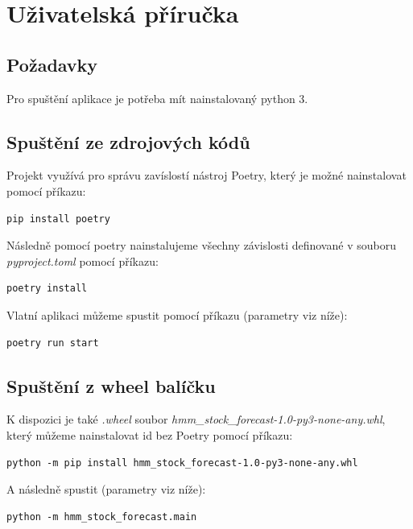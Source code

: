 \section{Uživatelská příručka}

\subsection{Požadavky}
Pro spuštění aplikace je potřeba mít nainstalovaný python 3.

\subsection{Spuštění ze zdrojových kódů}

Projekt využívá pro správu zavíslostí nástroj Poetry, který je možné nainstalovat
pomocí příkazu:
\begin{lstlisting}
pip install poetry
\end{lstlisting}

Následně pomocí poetry nainstalujeme všechny závislosti definované v souboru \emph{pyproject.toml}
pomocí příkazu:
\begin{lstlisting}
poetry install
\end{lstlisting}

Vlatní aplikaci můžeme spustit pomocí příkazu (parametry viz níže):
\begin{lstlisting}
poetry run start
\end{lstlisting}

\subsection{Spuštění z wheel balíčku}
K dispozici je také \emph{.wheel} soubor \emph{hmm\_stock\_forecast-1.0-py3-none-any.whl},
který můžeme nainstalovat id bez Poetry pomocí příkazu:
\begin{lstlisting}
python -m pip install hmm_stock_forecast-1.0-py3-none-any.whl
\end{lstlisting}
A následně spustit (parametry viz níže):
\begin{lstlisting}
python -m hmm_stock_forecast.main
\end{lstlisting}

